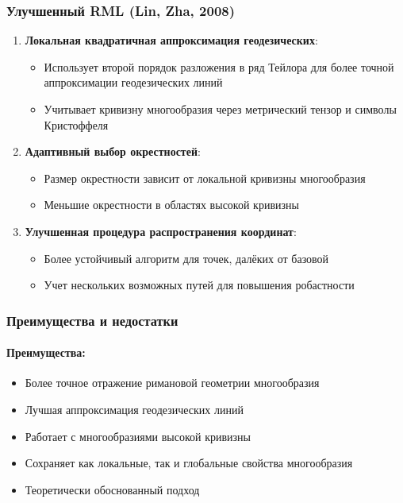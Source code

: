 \documentclass[a4paper,12pt]{article}
\begin{document}
\subsubsection{Улучшенный RML (Lin, Zha, 2008)}

\begin{enumerate}
    \item \textbf{Локальная квадратичная аппроксимация геодезических}:
    \begin{itemize}
        \item Использует второй порядок разложения в ряд Тейлора для более точной аппроксимации геодезических линий
        \item Учитывает кривизну многообразия через метрический тензор и символы Кристоффеля
    \end{itemize}

    \item \textbf{Адаптивный выбор окрестностей}:
    \begin{itemize}
        \item Размер окрестности зависит от локальной кривизны многообразия
        \item Меньшие окрестности в областях высокой кривизны
    \end{itemize}

    \item \textbf{Улучшенная процедура распространения координат}:
    \begin{itemize}
        \item Более устойчивый алгоритм для точек, далёких от базовой
        \item Учет нескольких возможных путей для повышения робастности
    \end{itemize}
\end{enumerate}

\subsubsection{Преимущества и недостатки}

\paragraph{Преимущества:}
\begin{itemize}
    \item Более точное отражение римановой геометрии многообразия
    \item Лучшая аппроксимация геодезических линий
    \item Работает с многообразиями высокой кривизны
    \item Сохраняет как локальные, так и глобальные свойства многообразия
    \item Теоретически обоснованный подход
\end{itemize}
\end{document}

